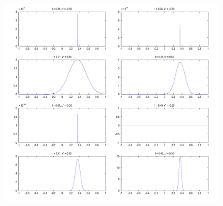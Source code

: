 \documentclass{article}
\begin{document}
\begin{figure}[]
\centering
\includegraphics[width=\textwidth]{plots/page2.pdf}
\label{fig:mammary_structure}
\end{figure}
\end{document}
